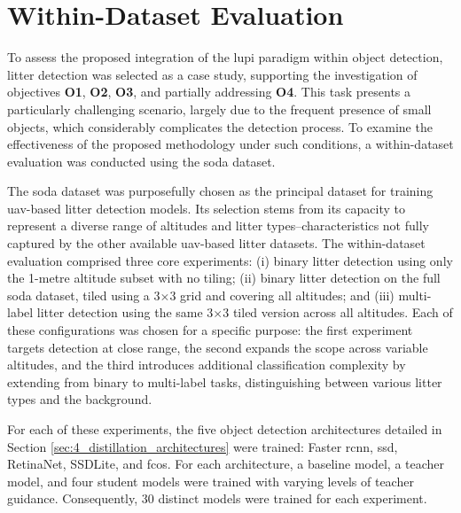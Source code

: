 \section{Within-Dataset Evaluation}
\label{sec:5_within_dataset_exp}


To assess the proposed integration of the \gls{lupi} paradigm within object detection, litter detection was selected as a case study, supporting the investigation of objectives \textbf{O1}, \textbf{O2}, \textbf{O3}, and partially addressing \textbf{O4}. This task presents a particularly challenging scenario, largely due to the frequent presence of small objects, which considerably complicates the detection process. To examine the effectiveness of the proposed methodology under such conditions, a within-dataset evaluation was conducted using the \gls{soda} dataset.

The \gls{soda} dataset was purposefully chosen as the principal dataset for training \gls{uav}-based litter detection models. Its selection stems from its capacity to represent a diverse range of altitudes and litter types--characteristics not fully captured by the other available \gls{uav}-based litter datasets. The within-dataset evaluation comprised three core experiments: (i) binary litter detection using only the 1-metre altitude subset with no tiling; (ii) binary litter detection on the full \gls{soda} dataset, tiled using a 3$\times$3 grid and covering all altitudes; and (iii) multi-label litter detection using the same 3$\times$3 tiled version across all altitudes. Each of these configurations was chosen for a specific purpose: the first experiment targets detection at close range, the second expands the scope across variable altitudes, and the third introduces additional classification complexity by extending from binary to multi-label tasks, distinguishing between various litter types and the background.

For each of these experiments, the five object detection architectures detailed in Section \ref{sec:4_distillation_architectures} were trained: Faster \gls{rcnn}, \gls{ssd}, RetinaNet, SSDLite, and \gls{fcos}. For each architecture, a baseline model, a teacher model, and four student models were trained with varying levels of teacher guidance. Consequently, 30 distinct models were trained for each experiment.

